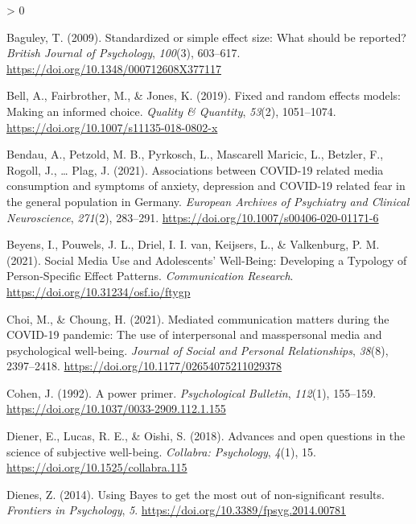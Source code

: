 \documentclass[
  english,
  man,mask,floatsintext]{apa6}
\newlength{\cslhangindent}
\newenvironment{CSLReferences}[2] %
 {%
  \setlength{\parindent}{0pt}
  \ifodd #1 \everypar{\setlength{\hangindent}{\cslhangindent}}\ignorespaces\fi
  \ifnum #2 > 0
  \setlength{\parskip}{#2\baselineskip}
  \fi
 }%
 {}
\begin{document}
\hypertarget{refs}{}
\begin{CSLReferences}{1}{0}
\leavevmode\hypertarget{ref-baguleyStandardizedSimpleEffect2009}{}%
Baguley, T. (2009). Standardized or simple effect size: {What} should be reported? \emph{British Journal of Psychology}, \emph{100}(3), 603--617. \url{https://doi.org/10.1348/000712608X377117}

\leavevmode\hypertarget{ref-bellFixedRandomEffects2019}{}%
Bell, A., Fairbrother, M., \& Jones, K. (2019). Fixed and random effects models: Making an informed choice. \emph{Quality \& Quantity}, \emph{53}(2), 1051--1074. \url{https://doi.org/10.1007/s11135-018-0802-x}

\leavevmode\hypertarget{ref-bendauAssociationsCOVID19Related2021}{}%
Bendau, A., Petzold, M. B., Pyrkosch, L., Mascarell Maricic, L., Betzler, F., Rogoll, J., \ldots{} Plag, J. (2021). Associations between {COVID}-19 related media consumption and symptoms of anxiety, depression and {COVID}-19 related fear in the general population in {Germany}. \emph{European Archives of Psychiatry and Clinical Neuroscience}, \emph{271}(2), 283--291. \url{https://doi.org/10.1007/s00406-020-01171-6}

\leavevmode\hypertarget{ref-beyensSocialMediaUse2021}{}%
Beyens, I., Pouwels, J. L., Driel, I. I. van, Keijsers, L., \& Valkenburg, P. M. (2021). Social {Media} {Use} and {Adolescents}' {Well}-{Being}: {Developing} a {Typology} of {Person}-{Specific} {Effect} {Patterns}. \emph{Communication Research}. \url{https://doi.org/10.31234/osf.io/ftygp}

\leavevmode\hypertarget{ref-choiMediatedCommunicationMatters2021}{}%
Choi, M., \& Choung, H. (2021). Mediated communication matters during the {COVID}-19 pandemic: {The} use of interpersonal and masspersonal media and psychological well-being. \emph{Journal of Social and Personal Relationships}, \emph{38}(8), 2397--2418. \url{https://doi.org/10.1177/02654075211029378}

\leavevmode\hypertarget{ref-cohenPowerPrimer1992}{}%
Cohen, J. (1992). A power primer. \emph{Psychological Bulletin}, \emph{112}(1), 155--159. \url{https://doi.org/10.1037/0033-2909.112.1.155}

\leavevmode\hypertarget{ref-dienerAdvancesOpenQuestions2018}{}%
Diener, E., Lucas, R. E., \& Oishi, S. (2018). Advances and open questions in the science of subjective well-being. \emph{Collabra: Psychology}, \emph{4}(1), 15. \url{https://doi.org/10.1525/collabra.115}

\leavevmode\hypertarget{ref-dienesUsingBayesGet2014}{}%
Dienes, Z. (2014). Using {Bayes} to get the most out of non-significant results. \emph{Frontiers in Psychology}, \emph{5}. \url{https://doi.org/10.3389/fpsyg.2014.00781}


\end{CSLReferences}
\end{document}
